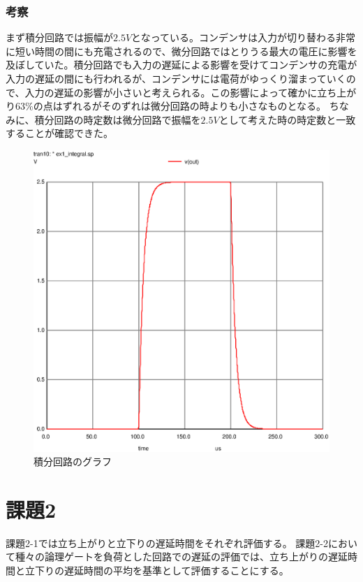\documentclass{jsarticle}
\begin{document}
\subsubsection{考察}
まず積分回路では振幅が$2.5V$となっている。コンデンサは入力が切り替わる非常に短い時間の間にも充電されるので、微分回路ではとりうる最大の電圧に影響を及ぼしていた。積分回路でも入力の遅延による影響を受けてコンデンサの充電が入力の遅延の間にも行われるが、コンデンサには電荷がゆっくり溜まっていくので、入力の遅延の影響が小さいと考えられる。この影響によって確かに立ち上がり$63\%$の点はずれるがそのずれは微分回路の時よりも小さなものとなる。
ちなみに、積分回路の時定数は微分回路で振幅を$2.5V$として考えた時の時定数と一致することが確認できた。
\begin{figure}[H]
    \hspace{50pt}
    \includegraphics[scale=0.8]{ex1_integral.ps}
    \vspace{30pt}
    \caption{積分回路のグラフ}
\end{figure}


\section{課題2}
課題2-1では立ち上がりと立下りの遅延時間をそれぞれ評価する。
課題2-2において種々の論理ゲートを負荷とした回路での遅延の評価では、立ち上がりの遅延時間と立下りの遅延時間の平均を基準として評価することにする。
\end{document}
